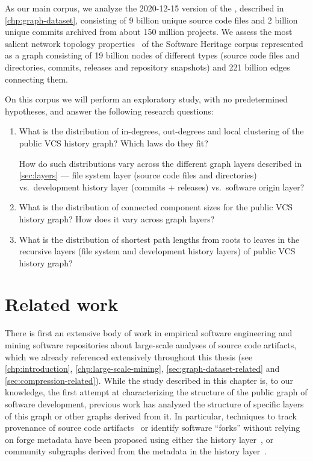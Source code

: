 As our main corpus, we analyze the 2020-12-15 version of the \SWHGD{},
described in \cref{chp:graph-dataset}, consisting of 9 billion unique source
code files and 2 billion unique commits archived from about 150 million
projects.  We assess the most salient network topology
properties~\cite{barabasi2002networkstats} of the Software Heritage corpus
represented as a graph consisting of 19 billion nodes of different types
(source code files and directories, commits, releases and repository snapshots)
and 221 billion edges connecting them.

On this corpus we will perform an exploratory study, with no predetermined
hypotheses, and answer the following research questions:
\begin{enumerate}[\bfseries RQ1]

\item\label{rq:degrees} %
  What is the distribution of in-degrees, out-degrees and local clustering of the
  public VCS history graph? Which laws do they fit?

  How do such distributions vary across the different graph layers described in
  \cref{sec:layers} --- file system layer (source code files and directories)
  vs.\ development history layer (commits + releases) vs.\ software origin
  layer?

\item\label{rq:ccs} %
  What is the distribution of connected component sizes for the public VCS
  history graph?  How does it vary across graph layers?

\item\label{rq:paths} %
  What is the distribution of shortest path lengths from roots to leaves in the
  recursive layers (file system and development history layers) of public VCS
  history graph?
\end{enumerate}


\section{Related work}%
\label{sec:topology-related}

There is first an extensive body of work in empirical software engineering and
mining software repositories about large-scale analyses of source code
artifacts, which we already referenced extensively throughout this thesis (see
\cref{chp:introduction}, \cref{chp:large-scale-mining},
\cref{sec:graph-dataset-related} and \cref{sec:compression-related}).
While the study described in this chapter is, to our knowledge, the first
attempt at characterizing the structure of the public graph of software
development, previous work has analyzed the structure of specific layers of
this graph or other graphs derived from it. In particular, techniques to track
provenance of source code artifacts~\cite{swh-provenance-emse} or identify
software ``forks'' without relying on forge metadata have been proposed using
either the history layer~\cite{swh-msr2020-forking}, or community subgraphs
derived from the metadata in the history layer~\cite{mockus2020complete}.

